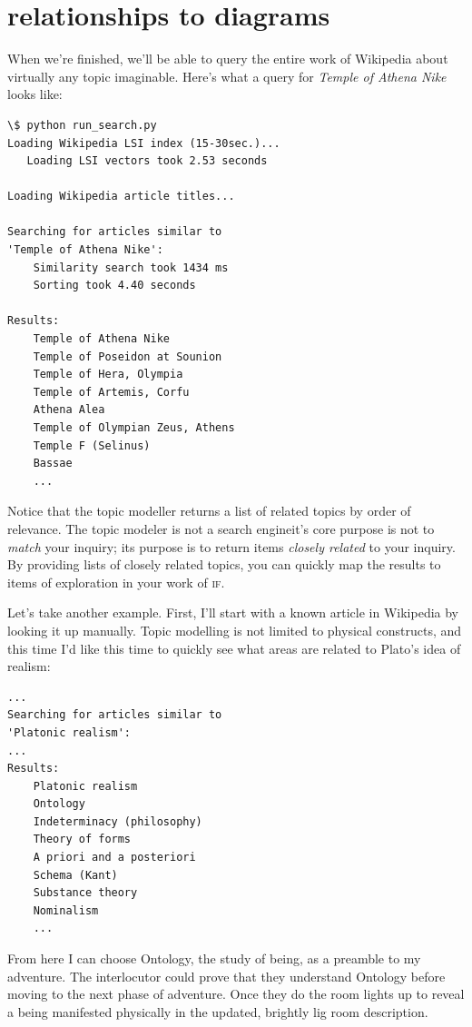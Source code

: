 \section{relationships to diagrams} \label{sec:relations}
When we're finished, we'll be able to query the entire work of
Wikipedia about virtually any topic imaginable. Here's what a query for
\textit{Temple of Athena Nike} looks like:
\begin{lstlisting}
\$ python run_search.py
Loading Wikipedia LSI index (15-30sec.)...
   Loading LSI vectors took 2.53 seconds

Loading Wikipedia article titles...

Searching for articles similar to
'Temple of Athena Nike':
    Similarity search took 1434 ms
    Sorting took 4.40 seconds

Results:
    Temple of Athena Nike
    Temple of Poseidon at Sounion
    Temple of Hera, Olympia
    Temple of Artemis, Corfu
    Athena Alea
    Temple of Olympian Zeus, Athens
    Temple F (Selinus)
    Bassae
    ...
  \end{lstlisting}

  Notice that the topic modeller returns a list of related topics by order of
  relevance. The topic modeler is not a search engine\textemdash it's core
  purpose is not to \textit{match} your inquiry; its purpose
  is to return items \textit{closely related} to your inquiry. By providing
  lists of closely related topics, you can quickly map the
  results to items of exploration in your work of \textsc{if}.

  Let's take another example. First, I'll start with a known article in Wikipedia
  by looking it up
  manually. Topic modelling is not limited to physical
constructs, and this time I'd like this time to quickly see what areas are related to
Plato's idea of realism:
\pagebreak
\begin{lstlisting}
...
Searching for articles similar to
'Platonic realism':
...
Results:
    Platonic realism
    Ontology
    Indeterminacy (philosophy)
    Theory of forms
    A priori and a posteriori
    Schema (Kant)
    Substance theory
    Nominalism
    ...
\end{lstlisting}
From here I can choose Ontology, the study of being, as a preamble to my
adventure. The interlocutor could prove that
they understand Ontology before moving to the next phase of adventure. Once they
do the room lights up to reveal a being manifested physically in the updated,
brightly lig room description.

